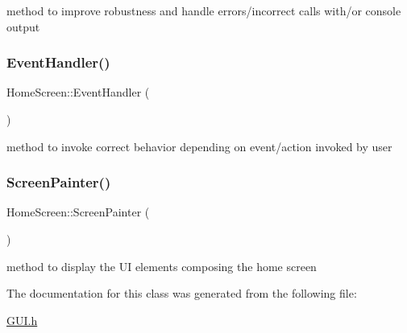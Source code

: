 method to improve robustness and handle errors/incorrect calls with/or console output \mbox{\label{class_home_screen_a4e7e2efcfd7caa30ce2098185a5e6009}} 
\subsubsection{\texorpdfstring{Event\+Handler()}{EventHandler()}}
{\footnotesize\ttfamily Home\+Screen\+::\+Event\+Handler (\begin{DoxyParamCaption}{ }\end{DoxyParamCaption})}

method to invoke correct behavior depending on event/action invoked by user \mbox{\label{class_home_screen_aab2d7fb46a2488713f38fb39a5cfc21b}} 
\subsubsection{\texorpdfstring{Screen\+Painter()}{ScreenPainter()}}
{\footnotesize\ttfamily Home\+Screen\+::\+Screen\+Painter (\begin{DoxyParamCaption}{ }\end{DoxyParamCaption})}

method to display the UI elements composing the home screen 

The documentation for this class was generated from the following file\+:\begin{DoxyCompactItemize}
\item 
\mbox{\hyperlink{_g_u_i_8h}{G\+U\+I.\+h}}\end{DoxyCompactItemize}
